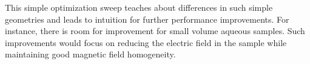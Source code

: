 This simple optimization sweep teaches about differences in such simple geometries and leads to intuition for further performance improvements. For instance, there is room for improvement for small volume aqueous samples. Such improvements would focus on reducing the electric field in the sample while maintaining good magnetic field homogeneity. 



{\renewcommand{\bibsection}{\clearpage\section*{\bibname}\markboth{\bibname}{\bibname}}
\renewcommand{\bibname}{CHAPTER 2. REFERENCES}


}

